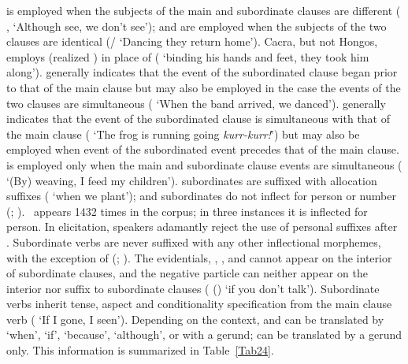 is employed when the subjects of the main and subordinate clauses are different ( ,   ‘Although  see, we don’t see’);  and  are employed when the subjects of the two clauses are identical (/   ‘Dancing they return home’). Cacra, but not Hongos, employs  (realized \textipa{[l]}) in place of  (  ‘binding his hands and feet, they took him along’).  generally indicates that the event of the subordinated clause began prior to that of the main clause but may also be employed in the case the events of the two clauses are simultaneous (   ‘When the band arrived, we danced’).  generally indicates that the event of the subordinated clause is simultaneous with that of the main clause (   ‘The frog is running going \emph{kurr-kurr!}’) but may also be employed when event of the subordinated event precedes that of the main clause.  is employed only when the main and subordinate clause events are simultaneous (   ‘(By) weaving, I feed my children’).  subordinates are suffixed with allocation suffixes ( ‘when we plant’);  and  subordinates do not inflect for person or number (; ).\
{ appears 1432 times in the corpus; in three instances it is inflected for person. In elicitation, speakers adamantly reject the use of personal suffixes after .} Subordinate verbs are never suffixed with any other inflectional morphemes, with the exception of  (; ). The evidentials, , , and  cannot appear on the interior of subordinate clauses, and the negative particle  can neither appear on the interior nor suffix to subordinate clauses ( () ‘if you don’t talk’). Subordinate verbs inherit tense, aspect and conditionality specification from the main clause verb (   ‘If I  gone, I  seen’). Depending on the context,  and  can be translated by ‘when’, ‘if’, ‘because’, ‘although’, or with a gerund;  can be translated by a gerund only. This information is summarized in Table~\ref{Tab24}.

